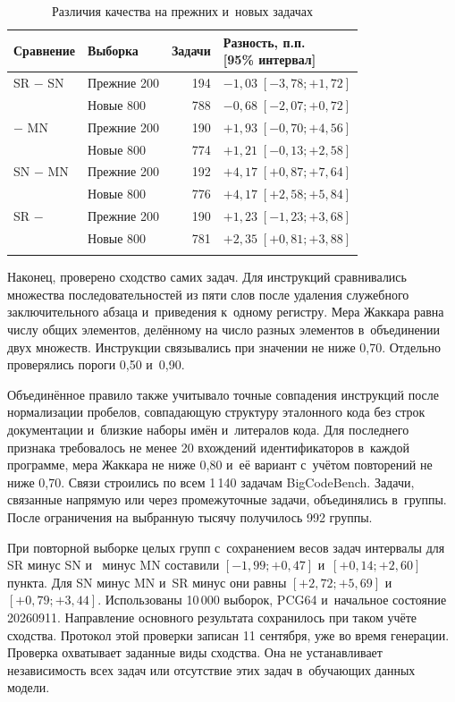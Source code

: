 \begin{table}[htbp]
\caption{Различия качества на прежних и~новых задачах}
\label{tab:subgroups}
\centering\small\setlength{\tabcolsep}{5pt}
\begin{tabular}{@{}llrl@{}}
\toprule
Сравнение & Выборка & Задачи & \shortstack{Разность, п.п.\\{}[95\% интервал]} \\
\midrule
SR $-$ SN & Прежние 200 & 194 & $-1{,}03\;[-3{,}78;+1{,}72]$ \\
 & Новые 800 & 788 & $-0{,}68\;[-2{,}07;+0{,}72]$ \\
\MultiCallRole{} $-$ MN & Прежние 200 & 190 & $+1{,}93\;[-0{,}70;+4{,}56]$ \\
 & Новые 800 & 774 & $+1{,}21\;[-0{,}13;+2{,}58]$ \\
SN $-$ MN & Прежние 200 & 192 & $+4{,}17\;[+0{,}87;+7{,}64]$ \\
 & Новые 800 & 776 & $+4{,}17\;[+2{,}58;+5{,}84]$ \\
SR $-$ \MultiCallRole{} & Прежние 200 & 190 & $+1{,}23\;[-1{,}23;+3{,}68]$ \\
 & Новые 800 & 781 & $+2{,}35\;[+0{,}81;+3{,}88]$ \\
\botrule
\end{tabular}
\end{table}
\FloatBarrier

Наконец, проверено сходство самих задач. Для инструкций сравнивались множества последовательностей из пяти слов после удаления служебного заключительного абзаца и~приведения к~одному регистру. Мера Жаккара равна числу общих элементов, делённому на число разных элементов в~объединении двух множеств. Инструкции связывались при значении не ниже 0,70. Отдельно проверялись пороги 0,50 и~0,90.

Объединённое правило также учитывало точные совпадения инструкций после нормализации пробелов, совпадающую структуру эталонного кода без строк документации и~близкие наборы имён и~литералов кода. Для последнего признака требовалось не менее 20 вхождений идентификаторов в~каждой программе, мера Жаккара не ниже 0,80 и~её вариант с~учётом повторений не ниже 0,70. Связи строились по всем 1\,140 задачам BigCodeBench. Задачи, связанные напрямую или через промежуточные задачи, объединялись в~группы. После ограничения на выбранную тысячу получилось 992 группы.

При повторной выборке целых групп с~сохранением весов задач интервалы для SR минус SN и~\MultiCallRole{} минус MN составили $[-1{,}99;+0{,}47]$ и~$[+0{,}14;+2{,}60]$ пункта. Для SN минус MN и~SR минус \MultiCallRole{} они равны $[+2{,}72;+5{,}69]$ и~$[+0{,}79;+3{,}44]$. Использованы 10\,000 выборок, PCG64 и~начальное состояние 20260911. Направление основного результата сохранилось при таком учёте сходства. Протокол этой проверки записан 11 сентября, уже во время генерации. Проверка охватывает заданные виды сходства. Она не устанавливает независимость всех задач или отсутствие этих задач в~обучающих данных модели.

